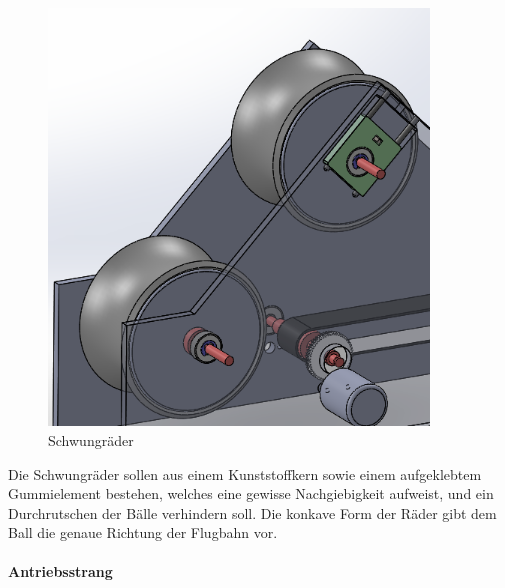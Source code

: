 \begin{figure}[h!]
	\centering
	\includegraphics[width=0.9\textwidth]{Enddokumentation/Loesungskonzept/Bilder/Schwungraeder.png}
	\caption{Schwungräder}
	\label{fig:Schwungräder}	
\end{figure}
Die Schwungräder sollen aus einem Kunststoffkern sowie einem aufgeklebtem Gummielement bestehen, welches eine gewisse Nachgiebigkeit aufweist, und ein Durchrutschen der Bälle verhindern soll.  Die konkave Form der Räder gibt dem Ball die genaue Richtung der Flugbahn vor.
\paragraph{Antriebsstrang}

